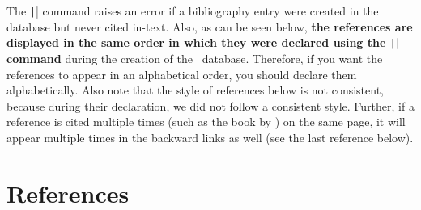 \documentclass[letter, 11pt]{article}
\begin{document}
  The \texttt|\dumbibCreateBibliography| command raises an error if a bibliography entry were created in the database but never cited in-text. Also, as can be seen below, \textbf{the references are displayed in the same order in which they were declared using the \texttt|\dumbibReferenceEntry{}| command} during the creation of the \dumbib\ database. Therefore, if you want the references to appear in an alphabetical order, you should declare them alphabetically. Also note that the style of references below is not consistent, because during their declaration, we did not follow a consistent style. Further, if a reference is cited multiple times (such as the book by \cite*{talagrand2022}) on the same page, it will appear multiple times in the backward links as well (see the last reference below).

  \section*{References}
  \dumbibCreateBibliography
\end{document}
